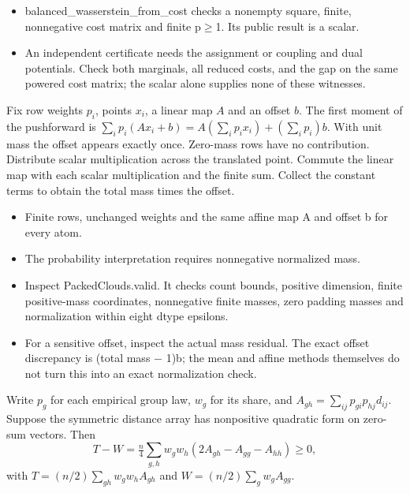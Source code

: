 \expandafter\def\csname statadic@diagnostics@STATADIC-TRANSPORT-001\endcsname{\begin{itemize}
\item balanced\_wasserstein\_from\_cost checks a nonempty square, finite, nonnegative cost matrix and finite p\ensuremath{\ge}1. Its public result is a scalar.
\item An independent certificate needs the assignment or coupling and dual potentials. Check both marginals, all reduced costs, and the gap on the same powered cost matrix; the scalar alone supplies none of these witnesses.
\end{itemize}}
\expandafter\def\csname statadic@statement@STATADIC-SAMPLE-001\endcsname{Fix row weights $p_i$, points $x_i$, a linear map $A$ and
  an offset $b$. The first moment of the pushforward is
  $\sum_i p_i(Ax_i+b)=A(\sum_i p_i x_i)+(\sum_i p_i)b$.
  With unit mass the offset appears exactly once. Zero-mass rows have no contribution.}
\expandafter\def\csname statadic@proof@STATADIC-SAMPLE-001\endcsname{Distribute scalar multiplication across the translated point.
  Commute the linear map with each scalar multiplication and the finite sum.
  Collect the constant terms to obtain the total mass times the offset.}
\expandafter\def\csname statadic@assumptions@STATADIC-SAMPLE-001\endcsname{\begin{itemize}
\item Finite rows, unchanged weights and the same affine map A and offset b for every atom.
\item The probability interpretation requires nonnegative normalized mass.
\end{itemize}}
\expandafter\def\csname statadic@diagnostics@STATADIC-SAMPLE-001\endcsname{\begin{itemize}
\item Inspect PackedClouds.valid. It checks count bounds, positive dimension, finite positive-mass coordinates, nonnegative finite masses, zero padding masses and normalization within eight dtype epsilons.
\item For a sensitive offset, inspect the actual mass residual. The exact offset discrepancy is (total mass \ensuremath{-} 1)b; the mean and affine methods themselves do not turn this into an exact normalization check.
\end{itemize}}
\expandafter\def\csname statadic@statement@STATADIC-DISCO-001\endcsname{Write $p_g$ for each empirical group law, $w_g$ for its
  share, and $A_{gh}=\sum_{ij}p_{gi}p_{hj}d_{ij}$. Suppose the symmetric
  distance array has nonpositive quadratic form on zero-sum vectors. Then
  \[
  T-W=\tfrac{n}{4}\sum_{g,h}w_gw_h(2A_{gh}-A_{gg}-A_{hh})\ge0,
  \]
  with $T=(n/2)\sum_{gh}w_gw_h A_{gh}$ and $W=(n/2)\sum_gw_g A_{gg}$.}
